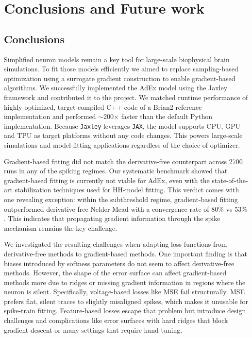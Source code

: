 \chapter{Conclusions and Future work}\label{ch:conclusionsAndFutureWork}
\section{Conclusions}\label{sec:conclusions}
Simplified neuron models remain a key tool for large-scale biophysical brain simulations.
To fit those models efficiently we aimed to replace sampling-based optimization using a surrogate gradient construction to enable gradient-based algorithms.
We successfully implemented the \gls{AdEx} model using the Jaxley framework and contributed it to the project.
We matched runtime performance of highly optimized, target-compiled C++ code of a Brian2 reference implementation and performed $\sim$200$\times$ faster than the default Python implementation.
Because \texttt{Jaxley} leverages \texttt{JAX}, the model supports CPU, GPU and TPU as target platforms without any code changes.
This powers large-scale simulations and model-fitting applications regardless of the choice of optimizer.

Gradient-based fitting did not match the derivative-free counterpart across 2700 runs in any of the spiking regimes.
Our systematic benchmark showed that gradient-based fitting is currently not viable for \gls{AdEx},
even with the state-of-the-art stabilization techniques used for \gls{HH}-model fitting.
This verdict comes with one revealing exception:
within the subthreshold regime, gradient-based fitting outperformed derivative-free Nelder-Mead with a convergence rate of $80\%$ vs $53\%$.
This indicates that propagating gradient information through the spike mechanism remains the key challenge.

We investigated the resulting challenges when adapting loss functions from derivative-free methods to gradient-based methods.
One important finding is that biases introduced by softness parameters do not seem to affect derivative-free methods.
However, the shape of the error surface can affect gradient-based methods more due to ridges or missing gradient information in regions where the neuron is silent.
Specifically, voltage-based losses like \gls{MSE} fail structurally.
MSE prefers flat, silent traces to slightly misaligned spikes, which makes it unusable for spike-train fitting.
Feature-based losses escape that problem but introduce design challenges and complications like error surfaces with hard ridges that block gradient descent or many settings that require hand-tuning.

